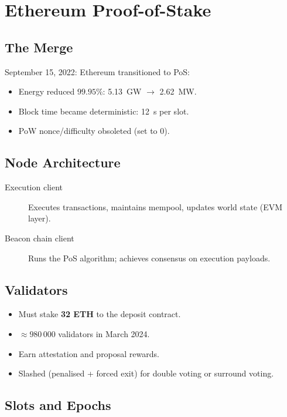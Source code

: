 \documentclass[12pt,a4paper,openany]{book}
\theoremstyle{definition}
\theoremstyle{plain}
\theoremstyle{remark}
\begin{document}
\chapter{Ethereum Proof-of-Stake}
\label{chap:ethpos}

\section{The Merge}

September 15, 2022: Ethereum transitioned to PoS:
\begin{itemize}
  \item Energy reduced $99.95\%$: 5.13~GW $\to$ 2.62~MW.
  \item Block time became deterministic: 12~s per slot.
  \item PoW nonce/difficulty obsoleted (set to 0).
\end{itemize}

\section{Node Architecture}

\begin{description}
  \item[Execution client] Executes transactions, maintains mempool,
       updates world state (EVM layer).
  \item[Beacon chain client] Runs the PoS algorithm; achieves consensus
       on execution payloads.
\end{description}

\section{Validators}

\begin{itemize}
  \item Must stake \textbf{32 ETH} to the deposit contract.
  \item $\approx 980\,000$ validators in March 2024.
  \item Earn attestation and proposal rewards.
  \item Slashed (penalised + forced exit) for double voting or surround
        voting.
\end{itemize}

\section{Slots and Epochs}
\end{document}
